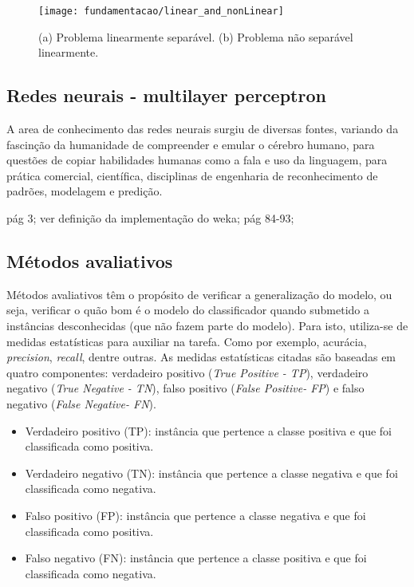 \begin{figure}[!htb] \centering 
  \centering
  \texttt{[image: fundamentacao/linear\_and\_nonLinear]} 
  \caption{(a) Problema linearmente separável. (b) Problema não separável linearmente.\cite{Elizondo:2006}} 
  \label{fig:slseparablenonseparable}
\end{figure}

\subsection{Redes neurais - multilayer perceptron}
\label{subsec:neuralnetwork}
A area de conhecimento das redes neurais surgiu de diversas fontes, variando da fascinção da humanidade de compreender e emular o cérebro humano, para questões de copiar habilidades humanas como a fala e uso da linguagem, para prática comercial, científica, disciplinas de engenharia de reconhecimento de padrões, modelagem e predição. 

pág 3;
ver definição da implementação do weka;
pág 84-93;

\subsection{Métodos avaliativos}
\label{subsec:evaluationMethods}
Métodos avaliativos têm o propósito de verificar a generalização do modelo, ou seja, verificar o quão bom é o modelo do classificador quando submetido a instâncias desconhecidas (que não fazem parte do modelo). Para isto, utiliza-se de medidas estatísticas para auxiliar na tarefa. Como por exemplo, acurácia, \textit{precision}, \textit{recall}, dentre outras. As medidas estatísticas citadas são baseadas em quatro componentes: verdadeiro positivo (\textit{True Positive - TP}), verdadeiro negativo (\textit{True Negative - TN}), falso positivo (\textit{False Positive- FP}) e falso negativo (\textit{False Negative- FN}).

\begin{itemize}
\item Verdadeiro positivo (TP): instância que pertence a classe positiva e que foi classificada como positiva.
\item Verdadeiro negativo (TN): instância que pertence a classe negativa e que foi classificada como negativa.
\item Falso positivo (FP): instância que pertence a classe negativa e que foi classificada como positiva.
\item Falso negativo (FN): instância que pertence a classe positiva e que foi classificada como negativa.
\end{itemize}

